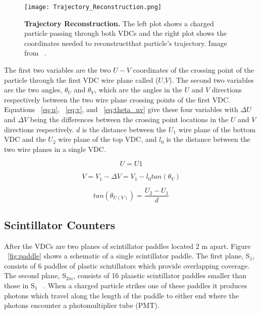 \begin{figure}[!ht]
\begin{center}
\texttt{[image: Trajectory\_Reconstruction.png]}
\end{center}
\caption{
{\bf{Trajectory Reconstruction.}} The left plot shows a charged particle passing through both VDCs and the right plot shows the coordinates needed to reconstructthat particle's trajectory. Image from ~\cite{Article:VDCs}.}
\label{fig:trajectory}
\end{figure}

The first two variables are the two $U-V$ coordinates of the crossing point of the particle through the first VDC wire plane called ($U$,$V$). The second two variables are the two angles, $\theta_U$ and $\theta_V$, which are the angles in the $U$ and $V$ directions respectively between the two wire plane crossing points of the first VDC. Equations ~\ref{eq:u}, ~\ref{eq:v}, and ~\ref{eq:theta_uv} give these four variables with $\Delta U$ and $\Delta V$ being the differences between the crossing point locations in the $U$ and $V$ directions respectively. $d$ is the distance between the $U_1$ wire plane of the bottom VDC and the $U_2$ wire plane of the top VDC, and $l_0$ is the distance between the two wire planes in a single VDC.

\begin{equation} \label{eq:u}
	U = U1
\end{equation}

\begin{equation} \label{eq:v}
	V = V_1-\Delta V = V_1 - l_0 tan\left( \theta_V \right)
\end{equation}

\begin{equation} \label{eq:theta_uv}
	tan\left( \theta_{U(V)} \right) = \frac{U_2-U_1}{d}
\end{equation}

\subsection{Scintillator Counters}
\label{ssec:scintillators}

After the VDCs are two planes of scintillator paddles located 2 m apart. Figure ~\ref{fig:paddle} shows a schematic of a single scintillator paddle. The first plane, S$_1$, consists of 6 paddles of plastic scintillators which provide overlapping coverage. The second plane, S$_{2m}$, consists of 16 plaastic scintillator paddles smaller than those in S$_1$ ~\cite{Thesis:Ye}. When a charged particle strikes one of these paddles it produces photons which travel along the length of the paddle to either end where the photons encounter a photomultiplier tube (PMT). 


